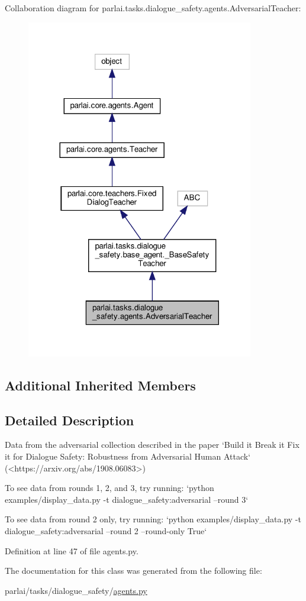 Collaboration diagram for parlai.\+tasks.\+dialogue\+\_\+safety.\+agents.\+Adversarial\+Teacher\+:
\nopagebreak
\begin{figure}[H]
\begin{center}
\leavevmode
\includegraphics[width=281pt]{classparlai_1_1tasks_1_1dialogue__safety_1_1agents_1_1AdversarialTeacher__coll__graph}
\end{center}
\end{figure}
\subsection*{Additional Inherited Members}


\subsection{Detailed Description}
\begin{DoxyVerb}Data from the adversarial collection described in the paper
`Build it Break it Fix it for Dialogue Safety: Robustness from
Adversarial Human Attack` (<https://arxiv.org/abs/1908.06083>)

To see data from rounds 1, 2, and 3, try running:
`python examples/display_data.py -t dialogue_safety:adversarial --round 3`

To see data from round 2 only, try running:
`python examples/display_data.py -t dialogue_safety:adversarial --round 2
 --round-only True`
\end{DoxyVerb}
 

Definition at line 47 of file agents.\+py.



The documentation for this class was generated from the following file\+:\begin{DoxyCompactItemize}
\item 
parlai/tasks/dialogue\+\_\+safety/\hyperlink{parlai_2tasks_2dialogue__safety_2agents_8py}{agents.\+py}\end{DoxyCompactItemize}
